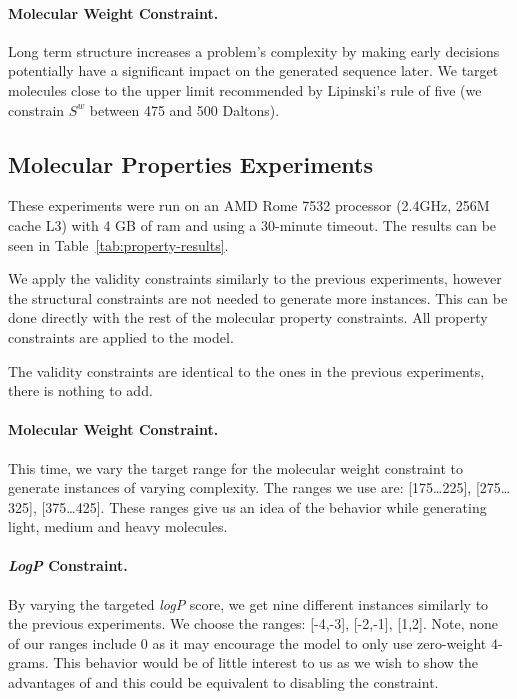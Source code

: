 \documentclass[../Document.tex]{subfiles}
\begin{document}
\paragraph{Molecular Weight Constraint.} Long term structure increases a problem's complexity by making early decisions potentially have a significant impact on the generated sequence later. We target molecules close to the upper limit recommended by Lipinski's rule of five (\ie we constrain $S^w$ between 475 and 500 Daltons).

\subsection{Molecular Properties Experiments}
These experiments were run on an AMD Rome 7532 processor (2.4GHz, 256M cache L3) with 4 GB of \gls{ram} and using a 30-minute timeout. The results can be seen in Table~\ref{tab:property-results}.

We apply the validity constraints similarly to the previous experiments, however the structural constraints are not needed to generate more instances. This can be done directly with the rest of the molecular property constraints. All property constraints are applied to the model.

The validity constraints are identical to the ones in the previous experiments, there is nothing to add.

\paragraph{Molecular Weight Constraint.} This time, we vary the target range for the molecular weight constraint to generate instances of varying complexity. The ranges we use are: [175\ldots225], [275\ldots325], [375\ldots425]. These ranges give us an idea of the behavior while generating light, medium and heavy molecules. 

\paragraph{\emph{LogP} Constraint.} By varying the targeted \emph{logP} score, we get nine different instances similarly to the previous experiments. We choose the ranges: [-4,-3], [-2,-1], [1,2]. Note, none of our ranges include 0 as it may encourage the model to only use zero-weight $4$-grams. This behavior would be of little interest to us as we wish to show the advantages of \bp and this could be equivalent to disabling the constraint.
\end{document}
